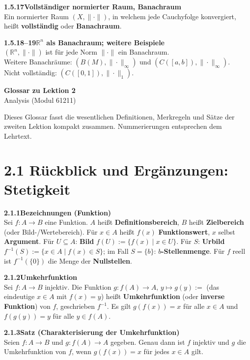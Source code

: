 \documentclass[a4paper,12pt]{article}
\newcommand{\gentry}[3]{%
  \noindent\textbf{#1\quad #2}\nopagebreak\\[0.2em]
  #3\par\smallskip
}
\begin{document}
\gentry{1.5.17}{Vollständiger normierter Raum, Banachraum}{%
  Ein normierter Raum $(X, \|\cdot\|)$, in welchem jede Cauchyfolge konvergiert,
  heißt \textbf{vollständig} oder \textbf{Banachraum}.
}

\gentry{1.5.18--19}{$\mathbb{R}^n$ als Banachraum; weitere Beispiele}{%
  $({\mathbb{R}^n}, \|\cdot\|)$ ist für jede Norm $\|\cdot\|$ ein Banachraum.\\
  Weitere Banachräume: $(B(M), \|\cdot\|_\infty)$ und $(C([a,b]), \|\cdot\|_\infty)$.\\
  Nicht vollständig: $(C([0,1]), \|\cdot\|_1)$.
}

\newpage

\begin{center}
  {\LARGE\bfseries Glossar zu Lektion 2}\\[0.5em]
  {\large Analysis (Modul 61211)}
\end{center}

\vspace{1em}

Dieses Glossar fasst die wesentlichen Definitionen, Merkregeln und Sätze der
zweiten Lektion kompakt zusammen. Nummerierungen entsprechen dem Lehrtext.

\section*{2.1 \quad Rückblick und Ergänzungen: Stetigkeit}

\gentry{2.1.1}{Bezeichnungen (Funktion)}{%
  Sei $f: A \to B$ eine Funktion. $A$ heißt \textbf{Definitionsbereich}, $B$
  heißt \textbf{Zielbereich} (oder Bild-/Wertebereich). Für $x \in A$ heißt
  $f(x)$ \textbf{Funktionswert}, $x$ selbst \textbf{Argument}.
  Für $U \subseteq A$: \textbf{Bild} $f(U) := \{f(x) \mid x \in U\}$.
  Für $S$: \textbf{Urbild} $f^{-1}(S) := \{x \in A \mid f(x) \in S\}$;
  im Fall $S = \{b\}$: \textbf{$b$-Stellenmenge}. Für $f$ reell ist $f^{-1}(\{0\})$
  die Menge der \textbf{Nullstellen}.
}

\gentry{2.1.2}{Umkehrfunktion}{%
  Sei $f: A \to B$ injektiv. Die Funktion $g: f(A) \to A$, $y \mapsto g(y) :=$
  (das eindeutige $x \in A$ mit $f(x) = y$) heißt \textbf{Umkehrfunktion} (oder
  \textbf{inverse Funktion}) von $f$, geschrieben $f^{-1}$.
  Es gilt $g(f(x)) = x$ für alle $x \in A$ und $f(g(y)) = y$ für alle $y \in f(A)$.
}

\gentry{2.1.3}{Satz (Charakterisierung der Umkehrfunktion)}{%
  Seien $f: A \to B$ und $g: f(A) \to A$ gegeben. Genau dann ist $f$ injektiv
  und $g$ die Umkehrfunktion von $f$, wenn $g(f(x)) = x$ für jedes $x \in A$ gilt.
}
\end{document}

